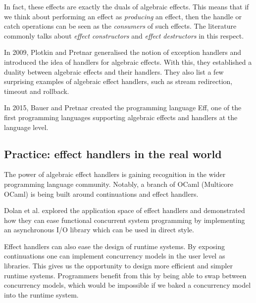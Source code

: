 \documentclass[class=article,crop=false,11pt]{standalone}
\begin{document}
In fact, these effects are exactly the duals of algebraic effects. This means
that if we think about performing an effect as \emph{producing} an effect, then
the handle or catch operations can be seen as the \emph{consumers} of such
effects. The literature commonly talks about \emph{effect constructors} and
\emph{effect destructors} in this respect.

In 2009, Plotkin and Pretnar \cite{plotkin2009handlers} generalised the notion
of exception handlers and introduced the idea of handlers for algebraic effects.
With this, they established a duality between algebraic effects and their
handlers. They also list a few surprising examples of algebraic effect handlers,
such as stream redirection, timeout and rollback.

In 2015, Bauer and Pretnar \cite{bauer2015programming} created the programming
language Eff, one of the first programming languages supporting algebraic
effects and handlers at the language level.

\subsection{Practice: effect handlers in the real world}

The power of algebraic effect handlers is gaining recognition in the wider
programming language community. Notably, a branch of OCaml (Multicore OCaml)
is being built around continuations and effect handlers.

Dolan et al. \cite{dolan2017concurrent} explored the application space of
effect handlers and demonstrated how they can ease functional concurrent
system programming by implementing an asynchronous I/O library which can be
used in direct style.

Effect handlers can also ease the design of runtime systems. By exposing
continuations one can implement concurrency models in the user level as
libraries. This gives us the opportunity to design more efficient and simpler
runtime systems. Programmers benefit from this by being able to swap between
concurrency models, which would be impossible if we baked a concurrency model
into the runtime system.

\ifstandalone
{}

\fi
\end{document}
